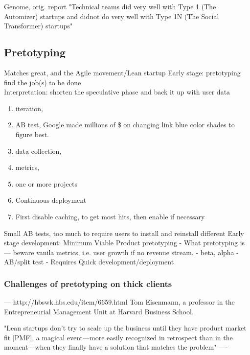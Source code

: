 \documentclass[a4paper,10pt]{book}
\begin{document}
 Genome, orig. report
 "Technical teams did very well with Type 1 (The Automizer) startups and didnot do very well with Type 1N (The Social Transformer) startups"
 
\subsection{Pretotyping}
Matches great, and the Agile movement/Lean startup
Early stage: pretotyping find the job(s) to be done
\\
Interpretation: shorten the speculative phase and back it up with user data
\begin{enumerate}
\item iteration, 
\item AB test, Google made millions of \$ on changing link blue color shades to figure best.
\item data collection, 
\item metrics, 
\item one or more projects
\item Continuous deployment
\item First disable caching, to get most hits, then enable if necessary
\end{enumerate}

Small AB tests, too much to require users to install and reinstall different
Early stage development: Minimum Viable Product pretotyping
 - What pretotyping is
  --- beware vanila metrics, i.e. user growth if no revenue stream.
 - beta, alpha
 - AB/split test
 - Requires Quick development/deployment
 



\subsubsection{Challenges of pretotyping on thick clients}

---
http://hbswk.hbs.edu/item/6659.html
Tom Eisenmann, a professor in the Entrepreneurial Management Unit at Harvard Business School.

"Lean startups don't try to scale up the business until they have product market fit [PMF], a magical event—more 
 easily recognized in retrospect than in the moment—when they finally have a solution that matches the problem"
----
\end{document}
